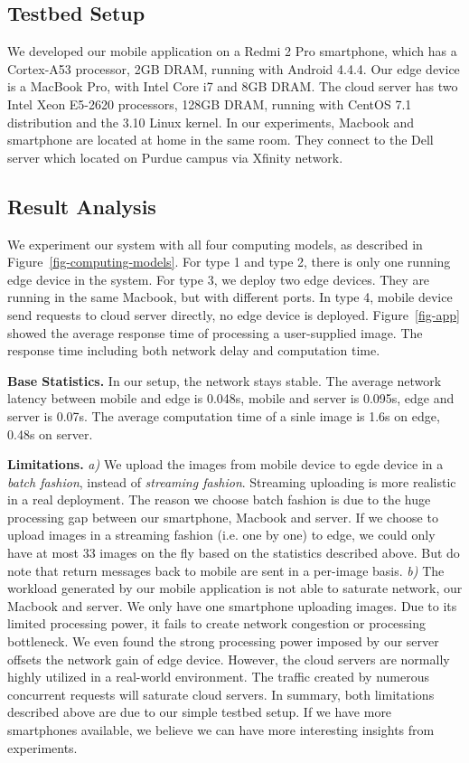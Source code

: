 \subsection{Testbed Setup}
We developed our mobile application on a Redmi 2 Pro smartphone, which has a Cortex-A53 processor, 2GB DRAM,
running with Android 4.4.4.
Our edge device is a MacBook Pro, with Intel Core i7 and 8GB DRAM. The cloud server has two Intel Xeon
E5-2620 processors, 128GB DRAM, running with CentOS 7.1 distribution and the 3.10 Linux kernel.
In our experiments, Macbook and smartphone are located at home in the same room. They connect to
the Dell server which located on Purdue campus via Xfinity network. 

\subsection{Result Analysis}
\label{sec:result-analysis}
We experiment our system with all four computing models, as described in Figure~\ref{fig-computing-models}.
For type 1 and type 2, there is only one running edge device in the system. For type 3, we deploy two
edge devices. They are running in the same Macbook, but with different ports. In type 4, mobile device
send requests to cloud server directly, no edge device is deployed. Figure~\ref{fig-app} showed the
average response time of processing a user-supplied image. The response time including both network
delay and computation time.

\hfill\break
\noindent \textbf{Base Statistics.}
In our setup, the network stays stable. The average network latency between mobile
and edge is 0.048s, mobile and server is 0.095s, edge and server is 0.07s.
The average computation time of a sinle image is 1.6s on edge, 0.48s on server.

\hfill\break
\noindent \textbf{Limitations.}
{\it a)} We upload the images from mobile device to egde device in a {\em batch fashion}, instead of
{\em streaming fashion}. Streaming uploading is more realistic in a real deployment.
The reason we choose batch fashion is due to
the huge processing gap between our smartphone, Macbook and server. If we choose to upload
images in a streaming fashion (i.e. one by one) to edge, we could only have at most
33 images on the fly based on the statistics described above. But do note that return messages
back to mobile are sent in a per-image basis.
{\it b)} The workload generated by our mobile application is not able to saturate network, our Macbook and server.
We only have one smartphone uploading images. Due to its limited processing power, it fails to create
network congestion or processing bottleneck. We even found the strong processing power imposed by our
server offsets the network gain of edge device. However, the cloud servers are normally highly utilized
in a real-world environment. The traffic created by numerous concurrent requests will saturate cloud
servers. In summary, both limitations described above are due to our simple testbed setup. If we have
more smartphones available, we believe we can have more interesting insights from experiments.

